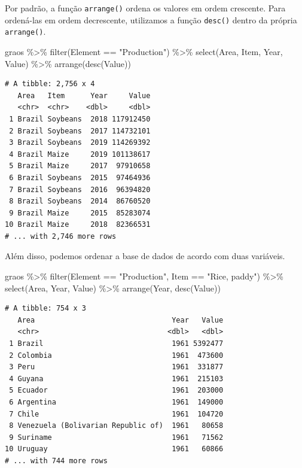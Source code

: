 \documentclass[
  brazilian,
]{book}
\newenvironment{Shaded}{\begin{snugshade}}{\end{snugshade}}
\newcommand{\FunctionTok}[1]{\textcolor[rgb]{0.00,0.00,0.00}{#1}}
\newcommand{\NormalTok}[1]{#1}
\newcommand{\SpecialCharTok}[1]{\textcolor[rgb]{0.00,0.00,0.00}{#1}}
\newcommand{\StringTok}[1]{\textcolor[rgb]{0.31,0.60,0.02}{#1}}
\begin{document}
Por padrão, a função \texttt{arrange()} ordena os valores em ordem crescente. Para ordená-las em ordem decrescente, utilizamos a função \texttt{desc()} dentro da própria \texttt{arrange()}.

\begin{Shaded}
\begin{Highlighting}[]
\NormalTok{graos }\SpecialCharTok{\%\textgreater{}\%} 
  \FunctionTok{filter}\NormalTok{(Element }\SpecialCharTok{==} \StringTok{"Production"}\NormalTok{) }\SpecialCharTok{\%\textgreater{}\%} 
  \FunctionTok{select}\NormalTok{(Area, Item, Year, Value) }\SpecialCharTok{\%\textgreater{}\%} 
  \FunctionTok{arrange}\NormalTok{(}\FunctionTok{desc}\NormalTok{(Value))}
\end{Highlighting}
\end{Shaded}

\begin{verbatim}
# A tibble: 2,756 x 4
   Area   Item      Year     Value
   <chr>  <chr>    <dbl>     <dbl>
 1 Brazil Soybeans  2018 117912450
 2 Brazil Soybeans  2017 114732101
 3 Brazil Soybeans  2019 114269392
 4 Brazil Maize     2019 101138617
 5 Brazil Maize     2017  97910658
 6 Brazil Soybeans  2015  97464936
 7 Brazil Soybeans  2016  96394820
 8 Brazil Soybeans  2014  86760520
 9 Brazil Maize     2015  85283074
10 Brazil Maize     2018  82366531
# ... with 2,746 more rows
\end{verbatim}

Além disso, podemos ordenar a base de dados de acordo com duas variáveis.

\begin{Shaded}
\begin{Highlighting}[]
\NormalTok{graos }\SpecialCharTok{\%\textgreater{}\%} 
  \FunctionTok{filter}\NormalTok{(Element }\SpecialCharTok{==} \StringTok{"Production"}\NormalTok{,}
\NormalTok{         Item }\SpecialCharTok{==} \StringTok{"Rice, paddy"}\NormalTok{) }\SpecialCharTok{\%\textgreater{}\%} 
  \FunctionTok{select}\NormalTok{(Area, Year, Value) }\SpecialCharTok{\%\textgreater{}\%} 
  \FunctionTok{arrange}\NormalTok{(Year, }\FunctionTok{desc}\NormalTok{(Value))}
\end{Highlighting}
\end{Shaded}

\begin{verbatim}
# A tibble: 754 x 3
   Area                                Year   Value
   <chr>                              <dbl>   <dbl>
 1 Brazil                              1961 5392477
 2 Colombia                            1961  473600
 3 Peru                                1961  331877
 4 Guyana                              1961  215103
 5 Ecuador                             1961  203000
 6 Argentina                           1961  149000
 7 Chile                               1961  104720
 8 Venezuela (Bolivarian Republic of)  1961   80658
 9 Suriname                            1961   71562
10 Uruguay                             1961   60866
# ... with 744 more rows
\end{verbatim}
\end{document}

